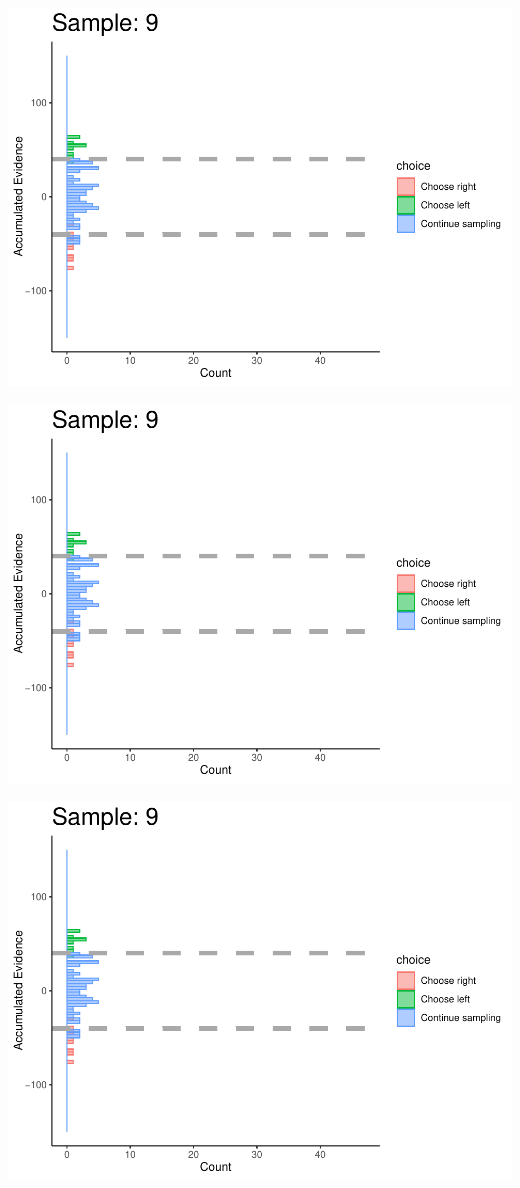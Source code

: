 \documentclass[
]{book}
\begin{document}
\begin{center}\includegraphics[width=0.8\linewidth]{LateNightBayes_files/figure-latex/collapsing_check-80} \end{center}

\begin{center}\includegraphics[width=0.8\linewidth]{LateNightBayes_files/figure-latex/collapsing_check-81} \end{center}

\begin{center}\includegraphics[width=0.8\linewidth]{LateNightBayes_files/figure-latex/collapsing_check-82} \end{center}
\end{document}
